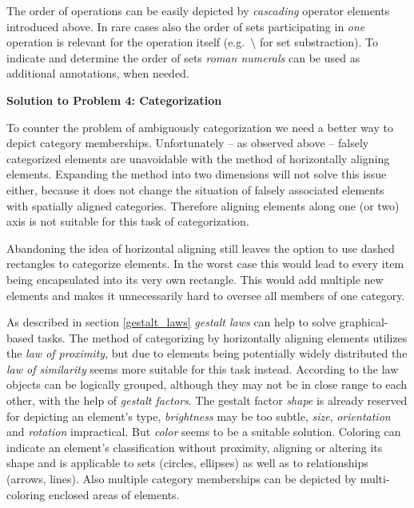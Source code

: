 \documentclass[twoside, openright, 12pt]{book}
\begin{document}
\noindent
The order of operations can be easily depicted by \textit{cascading} operator elements introduced above.
In rare cases also the order of sets participating in \textit{one} operation is relevant for the operation itself (e.g.~$\setminus$ for set substraction).
To indicate and determine the order of sets \textit{roman numerals} can be used as additional annotations, when needed.



\vspace{4mm}
\noindent
\textbf{Solution to Problem 4: Categorization}
\vspace{1mm}

\noindent
To counter the problem of ambiguously categorization we need a better way to depict category memberships.
Unfortunately -- as observed above -- falsely categorized elements are unavoidable with the method of horizontally aligning elements.
Expanding the method into two dimensions will not solve this issue either, because it does not change the situation of falsely associated elements with spatially aligned categories.
Therefore aligning elements along one (or two) axis is not suitable for this task of categorization.

Abandoning the idea of horizontal aligning still leaves the option to use dashed rectangles to categorize elements.
In the worst case this would lead to every item being encapsulated into its very own rectangle.
This would add multiple new elements and makes it unnecessarily hard to oversee all members of one category.

As described in section \ref{gestalt_laws} \textit{gestalt laws} can help to solve graphical-based tasks.
The method of categorizing by horizontally aligning elements utilizes the \textit{law of proximity}, but due to elements being potentially widely distributed the \textit{law of similarity} seems more suitable for this task instead.
According to the law objects can be logically grouped, although they may not be in close range to each other, with the help of \textit{gestalt factors}.
The gestalt factor \textit{shape} is already reserved for depicting an element's type, \textit{brightness} may be too subtle, \textit{size}, \textit{orientation} and \textit{rotation} impractical.
But \textit{color} seems to be a suitable solution.
Coloring can indicate an element's classification without proximity, aligning or altering its shape and is applicable to sets (circles, ellipses) as well as to relationships (arrows, lines).
Also multiple category memberships can be depicted by multi-coloring enclosed areas of elements.
\end{document}
